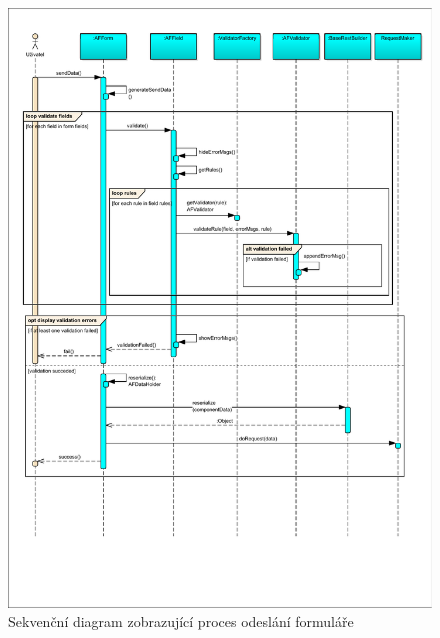 \begin{figure}
\begin{center}
\includegraphics[width=\textwidth, height=\textheight]{figures/sequenceSendForm}
\caption{Sekvenční diagram zobrazující proces odeslání formuláře}
\label{img:sdFormSend}
\end{center}
\end{figure}

